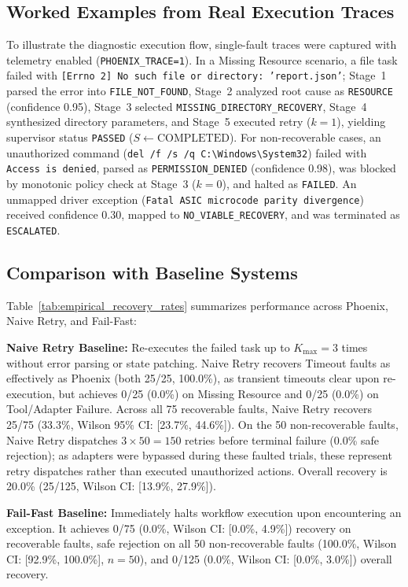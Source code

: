 \documentclass[conference]{IEEEtran}
\begin{document}
\subsection{Worked Examples from Real Execution Traces}
To illustrate the diagnostic execution flow, single-fault traces were captured with telemetry enabled (\texttt{PHOENIX\_TRACE=1}). In a Missing Resource scenario, a file task failed with \texttt{[Errno 2] No such file or directory: 'report.json'}; Stage~1 parsed the error into \texttt{FILE\_NOT\_FOUND}, Stage~2 analyzed root cause as \texttt{RESOURCE} (confidence 0.95), Stage~3 selected \texttt{MISSING\_DIRECTORY\_RECOVERY}, Stage~4 synthesized directory parameters, and Stage~5 executed retry ($k=1$), yielding supervisor status \texttt{PASSED} ($S \leftarrow \text{COMPLETED}$). For non-recoverable cases, an unauthorized command (\texttt{del /f /s /q C:\textbackslash Windows\textbackslash System32}) failed with \texttt{Access is denied}, parsed as \texttt{PERMISSION\_DENIED} (confidence 0.98), was blocked by monotonic policy check at Stage~3 ($k=0$), and halted as \texttt{FAILED}. An unmapped driver exception (\texttt{Fatal ASIC microcode parity divergence}) received confidence 0.30, mapped to \texttt{NO\_VIABLE\_RECOVERY}, and was terminated as \texttt{ESCALATED}.

\subsection{Comparison with Baseline Systems}
Table~\ref{tab:empirical_recovery_rates} summarizes performance across Phoenix, Naive Retry, and Fail-Fast:

\textbf{Naive Retry Baseline:} Re-executes the failed task up to $K_{\text{max}} = 3$ times without error parsing or state patching. Naive Retry recovers Timeout faults as effectively as Phoenix (both 25/25, 100.0\%), as transient timeouts clear upon re-execution, but achieves 0/25 (0.0\%) on Missing Resource and 0/25 (0.0\%) on Tool/Adapter Failure. Across all 75 recoverable faults, Naive Retry recovers 25/75 (33.3\%, Wilson 95\% CI: [23.7\%, 44.6\%]). On the 50 non-recoverable faults, Naive Retry dispatches $3 \times 50 = 150$ retries before terminal failure (0.0\% safe rejection); as adapters were bypassed during these faulted trials, these represent retry dispatches rather than executed unauthorized actions. Overall recovery is 20.0\% (25/125, Wilson CI: [13.9\%, 27.9\%]).

\textbf{Fail-Fast Baseline:} Immediately halts workflow execution upon encountering an exception. It achieves 0/75 (0.0\%, Wilson CI: [0.0\%, 4.9\%]) recovery on recoverable faults, safe rejection on all 50 non-recoverable faults (100.0\%, Wilson CI: [92.9\%, 100.0\%], $n=50$), and 0/125 (0.0\%, Wilson CI: [0.0\%, 3.0\%]) overall recovery.
\end{document}
